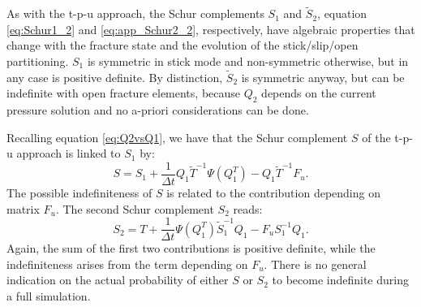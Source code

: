 \documentclass[3p,times]{elsarticle}
\theoremstyle{plain}
\newcommand{\Mat}[1]{#1}
\newcommand{\tS}{\widetilde{S}}
\newcommand{\tT}{\widetilde{T}}
\begin{document}
\begin{rem}
As with the t-p-u approach, the Schur complements $S_1$ and $\tS_2$, equation \eqref{eq:Schur1_2} and \eqref{eq:app_Schur2_2}, respectively, have algebraic properties that change with the fracture state and the evolution of the stick/slip/open partitioning. $S_1$ is symmetric in stick mode and non-symmetric otherwise, but in any case is positive definite. By distinction, $\tS_2$ is symmetric anyway, but can be indefinite with open fracture elements, because $Q_2$ depends on the current pressure solution and no a-priori considerations can be done.
\end{rem}

Recalling equation \eqref{eq:Q2vsQ1}, we have that the Schur complement $S$ of the t-p-u approach is linked to $S_1$ by:
\begin{equation}
  \Mat{S} = \Mat{S}_1 + \frac{1}{\Delta t}\Mat{Q}_1 \Mat{\tT}^{-1} \Psi\left(\Mat{Q}_1^T\right) - \Mat{Q}_1
    \Mat{\tT}^{-1} \Mat{F}_u.
\end{equation}
The possible indefiniteness of $S$ is related to the contribution depending on matrix $\Mat{F}_u$. The second Schur complement $S_2$ reads:
\begin{equation}
  \Mat{S}_2 = \Mat{T} + \frac{1}{\Delta t}\Psi\left(\Mat{Q}_1^T\right) \Mat{\tS}_1^{-1} \Mat{Q}_1 - \Mat{F}_u
    \Mat{S}_1^{-1} \Mat{Q}_1.
\end{equation}
Again, the sum of the first two contributions is positive definite, while the indefiniteness arises from the term depending on $\Mat{F}_u$.
There is no general indication on the actual probability of either $S$ or $S_2$ to become indefinite during a full simulation. 

\end{document}
